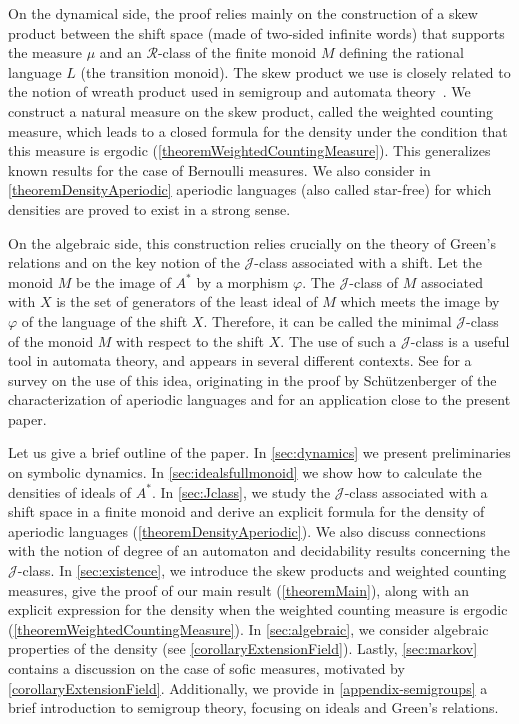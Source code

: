 \documentclass[a4paper,UKenglish,numberwithinsect,cleveref]{lipics-v2021}
\newcommand{\JJ}{\mathrel{\mathscr{J}}}
\newcommand{\RR}{\mathrel{\mathscr{R}}}
\begin{document}
 On the dynamical side, the proof relies  mainly on  the construction of a skew product between the shift space (made of two-sided infinite words)  that supports  the measure
 $\mu$ and an $\RR$-class of the finite monoid $M$  defining  the rational language  $L$ (the transition monoid). The skew product we use is closely related to the notion of wreath product used in semigroup and automata theory~\cite[Chapter 1, Section 10]{Eilenberg1976}. We  construct a natural measure on the skew product, called the weighted counting measure, which leads to a closed formula for the density under the condition that this measure is ergodic (\cref{theoremWeightedCountingMeasure}). This generalizes known results for the case of Bernoulli measures. We also consider in \cref{theoremDensityAperiodic}   aperiodic languages (also called star-free)  for which densities are proved to exist in a  strong sense.

On the algebraic side, this construction relies crucially on the theory of Green's relations and on the key notion of the $\JJ$-class associated with a shift. Let the monoid $M$ be the image of $A^*$ by a morphism $\varphi$. The $\JJ$-class of $M$ associated with $X$ is the set of generators of the least ideal of $M$ which meets the image by $\varphi$ of the language of the shift  $X$.
Therefore, it can be called the minimal $\JJ$-class of the monoid $M$ with respect to the shift $X$.
The use of such a $\JJ$-class is a useful tool in automata theory, and appears in several
different contexts. See \cite{Colcombet2011} for a survey on the use of this idea,
originating in the proof by Sch\"utzenberger of the characterization of aperiodic languages
and \cite{PerrinSchupp1986} for an application close to the present paper.

Let us give a brief outline of the paper. In \cref{sec:dynamics} we present preliminaries on symbolic dynamics. In \cref{sec:idealsfullmonoid} we show how to calculate the densities of ideals of $A^*$. In \cref{sec:Jclass}, we study the $\JJ$-class associated with a shift space in a finite monoid and derive an explicit formula for the density of aperiodic languages (\cref{theoremDensityAperiodic}). We also  discuss connections with the notion of degree of an automaton and decidability results concerning the $\JJ$-class. In \cref{sec:existence}, we introduce the skew products and weighted counting measures, give the proof of our main result (\cref{theoremMain}), along with an explicit expression for the density when the weighted counting measure is ergodic (\cref{theoremWeightedCountingMeasure}). In \cref{sec:algebraic}, we consider algebraic properties of the density (see \cref{corollaryExtensionField}). Lastly, \cref{sec:markov} contains a discussion on the case of sofic measures, motivated by  \cref{corollaryExtensionField}.
Additionally, we provide in \cref{appendix-semigroups} a brief introduction to semigroup theory, focusing on ideals and Green's relations.
\end{document}
